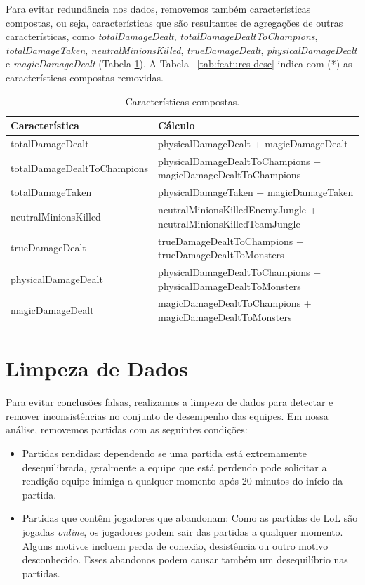 Para evitar redundância nos dados, removemos também características compostas, ou seja, características que são resultantes de agregações de outras características, como \textit{totalDamageDealt}, \textit{totalDamageDealtToChampions}, \textit{totalDamageTaken}, \textit{neutralMinionsKilled}, \textit{trueDamageDealt}, \textit{physicalDamageDealt} e \textit{magicDamageDealt} (Tabela \ref{tab:compound-features}). A Tabela ~\ref{tab:features-desc} indica com (*) as características compostas removidas.

\begin{table}
  \scriptsize
  \caption{Características compostas.}
  \label{tab:compound-features}
  \begin{tabular}{p{}p{}}
    \toprule
    Característica & Cálculo \\
    \midrule
totalDamageDealt & physicalDamageDealt + magicDamageDealt\\
totalDamageDealtToChampions & physicalDamageDealtToChampions + magicDamageDealtToChampions \\
totalDamageTaken & physicalDamageTaken + magicDamageTaken \\
neutralMinionsKilled & neutralMinionsKilledEnemyJungle + neutralMinionsKilledTeamJungle \\
trueDamageDealt & trueDamageDealtToChampions + trueDamageDealtToMonsters \\
physicalDamageDealt & physicalDamageDealtToChampions + physicalDamageDealtToMonsters \\
magicDamageDealt & magicDamageDealtToChampions + magicDamageDealtToMonsters \\
  \bottomrule
\end{tabular}
\end{table}

\section{Limpeza de Dados}
Para evitar conclusões falsas, realizamos a limpeza de dados para detectar e remover inconsistências no conjunto de desempenho das equipes. Em nossa análise, removemos partidas com as seguintes condições:

\begin{itemize}
\item Partidas rendidas: dependendo se uma partida está extremamente desequilibrada, geralmente a equipe que está perdendo pode solicitar a rendição  equipe inimiga a qualquer momento após 20 minutos do início da partida.
\item Partidas que contêm jogadores que abandonam: Como as partidas de LoL são jogadas \textit{online}, os jogadores podem sair das partidas a qualquer momento. Alguns motivos incluem perda de conexão, desistência ou outro motivo desconhecido. Esses abandonos podem causar também um desequilíbrio nas partidas.
\end{itemize}

